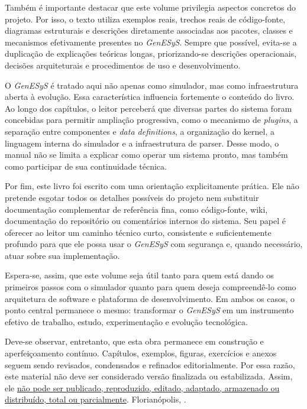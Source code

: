Também é importante destacar que este volume privilegia aspectos concretos do projeto. Por isso, o texto utiliza exemplos reais, trechos reais de código-fonte, diagramas estruturais e descrições diretamente associadas aos pacotes, classes e mecanismos efetivamente presentes no \textit{GenESyS}. Sempre que possível, evita-se a duplicação de explicações teóricas longas, priorizando-se descrições operacionais, decisões arquiteturais e procedimentos de uso e desenvolvimento.

O \textit{GenESyS} é tratado aqui não apenas como simulador, mas como infraestrutura aberta à evolução. Essa característica influencia fortemente o conteúdo do livro. Ao longo dos capítulos, o leitor perceberá que diversas partes do sistema foram concebidas para permitir ampliação progressiva, como o mecanismo de \textit{plugins}, a separação entre componentes e \textit{data definitions}, a organização do kernel, a linguagem interna do simulador e a infraestrutura de parser. Desse modo, o manual não se limita a explicar como operar um sistema pronto, mas também como participar de sua continuidade técnica.

Por fim, este livro foi escrito com uma orientação explicitamente prática. Ele não pretende esgotar todos os detalhes possíveis do projeto nem substituir documentação complementar de referência fina, como código-fonte, wiki, documentação do repositório ou comentários internos do sistema. Seu papel é oferecer ao leitor um caminho técnico curto, consistente e suficientemente profundo para que ele possa usar o \textit{GenESyS} com segurança e, quando necessário, atuar sobre sua implementação.

Espera-se, assim, que este volume seja útil tanto para quem está dando os primeiros passos com o simulador quanto para quem deseja compreendê-lo como arquitetura de software e plataforma de desenvolvimento. Em ambos os casos, o ponto central permanece o mesmo: transformar o \textit{GenESyS} em um instrumento efetivo de trabalho, estudo, experimentação e evolução tecnológica.

Deve-se observar, entretanto, que esta obra permanece em construção e aperfeiçoamento contínuo. Capítulos, exemplos, figuras, exercícios e anexos seguem sendo revisados, condensados e refinados editorialmente. Por essa razão, este material não deve ser considerado versão finalizada ou estabilizada. Assim, ele \ul{não pode ser publicado, reproduzido, editado, adaptado, armazenado ou distribuído, total ou parcialmente}.
\newline
\noindent Florianópolis, \datalonga.